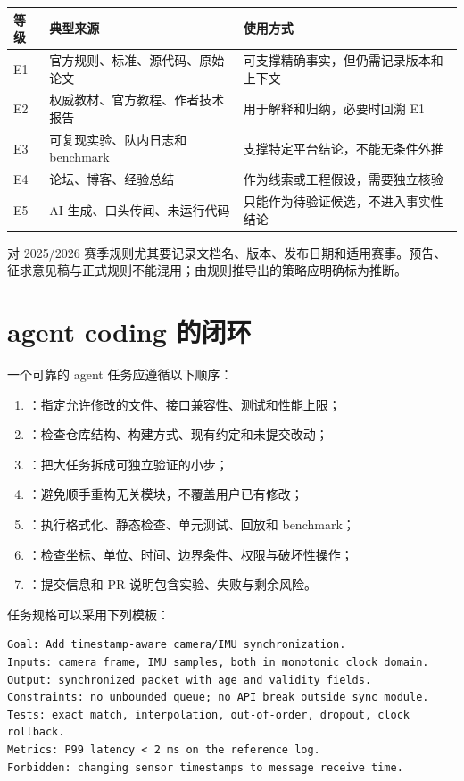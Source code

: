 \begin{longtable}{p{}p{}p{}}
\toprule
等级 & 典型来源 & 使用方式 \\
\midrule
E1 & 官方规则、标准、源代码、原始论文 & 可支撑精确事实，但仍需记录版本和上下文 \\
E2 & 权威教材、官方教程、作者技术报告 & 用于解释和归纳，必要时回溯 E1 \\
E3 & 可复现实验、队内日志和 benchmark & 支撑特定平台结论，不能无条件外推 \\
E4 & 论坛、博客、经验总结 & 作为线索或工程假设，需要独立核验 \\
E5 & AI 生成、口头传闻、未运行代码 & 只能作为待验证候选，不进入事实性结论 \\
\bottomrule
\end{longtable}

对 2025/2026 赛季规则尤其要记录文档名、版本、发布日期和适用赛事。预告、征求意见稿与正式规则不能混用；由规则推导出的策略应明确标为推断。

\section{agent coding 的闭环}

一个可靠的 agent 任务应遵循以下顺序：

\begin{enumerate}
  \item {}：指定允许修改的文件、接口兼容性、测试和性能上限；
  \item {}：检查仓库结构、构建方式、现有约定和未提交改动；
  \item {}：把大任务拆成可独立验证的小步；
  \item {}：避免顺手重构无关模块，不覆盖用户已有修改；
  \item {}：执行格式化、静态检查、单元测试、回放和 benchmark；
  \item {}：检查坐标、单位、时间、边界条件、权限与破坏性操作；
  \item {}：提交信息和 PR 说明包含实验、失败与剩余风险。
\end{enumerate}

任务规格可以采用下列模板：

\begin{lstlisting}[language={}]
Goal: Add timestamp-aware camera/IMU synchronization.
Inputs: camera frame, IMU samples, both in monotonic clock domain.
Output: synchronized packet with age and validity fields.
Constraints: no unbounded queue; no API break outside sync module.
Tests: exact match, interpolation, out-of-order, dropout, clock rollback.
Metrics: P99 latency < 2 ms on the reference log.
Forbidden: changing sensor timestamps to message receive time.
\end{lstlisting}

